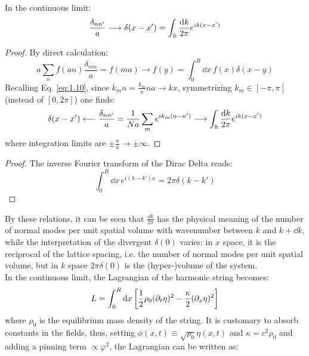 \begin{proposition}\label{prop-delta-cont}
  In the continuous limit:
  \begin{equation*}
    \frac{\delta_{nn'}}{a} \longrightarrow \delta(x - x') = \int_{\mathbb{R}} \frac{\mathrm{d} k}{2\pi} e^{i k (x - x')}
  \end{equation*}
\end{proposition}
\begin{proof}
  By direct calculation:
  \begin{equation*}
    a \sum_{n} f(an) \frac{\delta_{nm}}{a} = f(ma) \longrightarrow f(y) = \int_0^R \dd x\, f(x) \delta(x - y)
  \end{equation*}
  Recalling Eq. \ref{eq:1.10}, since $ k_m n = \frac{k_m}{a} na \rightarrow k x $, symmetrizing $ k_m \in [-\pi, \pi] $ (instead of $ [0, 2\pi] $) one finds:
  \begin{equation*}
    \delta(x - x') \longleftarrow \frac{\delta_{nn'}}{a} = \frac{1}{Na} \sum_{m} e^{ik_m (n - n')} \longrightarrow \int_{\mathbb{R}} \frac{\mathrm{d} k}{2\pi} e^{ik (x - x')}
  \end{equation*}
  where integration limits are $ \pm \frac{\pi}{a} \rightarrow \pm \infty $.
\end{proof}
\begin{proof}
  The inverse Fourier transform of the Dirac Delta reads:
  \begin{equation*}
    \int_0^R \dd x\, e^{i (k - k') x} = 2\pi \delta(k - k')
  \end{equation*}
\end{proof}
By these relations, it can be seen that $ \frac{\dd k}{2\pi} $ has the physical meaning of the number of normal modes per unit spatial volume with wavenumber between $ k $ and $ k + \dd k $, while the interpretation of the divergent $ \delta(0) $ varies: in $ x $ space, it is the reciprocal of the lattice spacing, i.e. the number of normal modes per unit spatial volume, but in $ k $ space $ 2\pi \delta(0) $ is the (hyper-)volume of the system.\\
In the continuous limit, the Lagrangian of the harmonic string becomes:
\begin{equation*}
  L = \int_0^R \mathrm{d} x \left[ \frac{1}{2} \rho_0 (\partial_t \eta)^2 - \frac{\kappa}{2} (\partial_x \eta)^2 \right]
\end{equation*}
where $ \rho_0 $ is the equilibrium mass density of the string. It is customary to absorb constants in the fields, thus, setting $ \phi(x,t) \equiv \sqrt{\rho_0} \eta(x,t) $ and $ \kappa = c^2 \rho_0 $ and adding a pinning term $ \propto \varphi^2 $, the Lagrangian can be written as:
